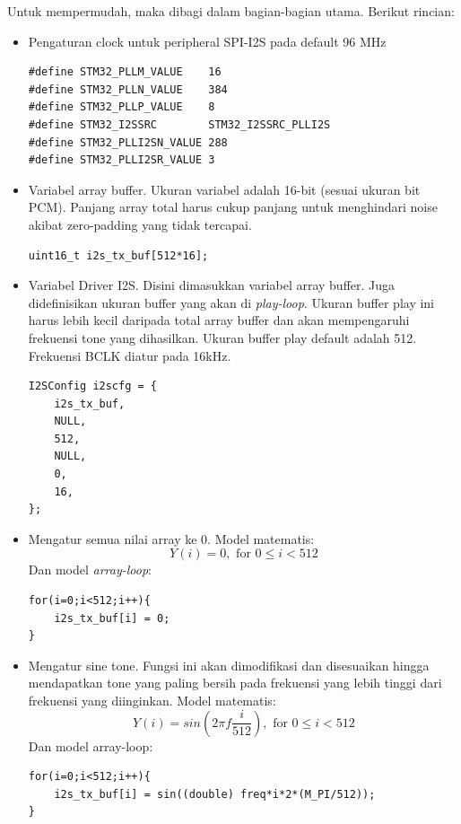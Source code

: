 \documentclass[12pt,]{article}
\begin{document}
	Untuk mempermudah, maka dibagi dalam bagian-bagian utama.
	Berikut rincian:
	\begin{itemize}
		\item Pengaturan clock untuk peripheral SPI-I2S pada default 96 MHz
		\begin{verbatim}
#define STM32_PLLM_VALUE    16
#define STM32_PLLN_VALUE    384
#define STM32_PLLP_VALUE    8
#define STM32_I2SSRC        STM32_I2SSRC_PLLI2S
#define STM32_PLLI2SN_VALUE 288
#define STM32_PLLI2SR_VALUE 3
		\end{verbatim}

		\item Variabel array buffer.
		Ukuran variabel adalah 16-bit (sesuai ukuran bit PCM).
		Panjang array total harus cukup panjang untuk menghindari
		noise akibat zero-padding yang tidak tercapai.
		\begin{verbatim}
uint16_t i2s_tx_buf[512*16];
		\end{verbatim}

		\item Variabel Driver I2S.
		Disini dimasukkan variabel array buffer.
		Juga didefinisikan ukuran buffer yang akan di \textit{play-loop}.
		Ukuran buffer play ini harus lebih kecil daripada total array buffer
		dan akan mempengaruhi frekuensi tone yang dihasilkan.
		Ukuran buffer play default adalah 512.
		Frekuensi BCLK diatur pada 16kHz.
		\begin{verbatim}
I2SConfig i2scfg = {
	i2s_tx_buf,
	NULL,
	512,
	NULL,
	0,
	16,
};
		\end{verbatim}

		\newpage
		\item Mengatur semua nilai array ke 0.
		Model matematis:
		\[ Y(i) = 0, \text{ for } 0 \leq i < 512 \]
		Dan model \textit{array-loop}:
		\begin{verbatim}
for(i=0;i<512;i++){
	i2s_tx_buf[i] = 0;
}
		\end{verbatim}

		\item Mengatur sine tone.
		Fungsi ini akan dimodifikasi dan disesuaikan hingga mendapatkan
		tone yang paling bersih pada frekuensi yang lebih tinggi
		dari frekuensi yang diinginkan.
		Model matematis:
		\[ Y(i) = sin(2\pi f \frac{i}{512}), \text{ for } 0 \leq i < 512 \]
		Dan model array-loop:
		\begin{verbatim}
for(i=0;i<512;i++){
	i2s_tx_buf[i] = sin((double) freq*i*2*(M_PI/512));
}
		\end{verbatim}


\end{itemize}
\end{document}
